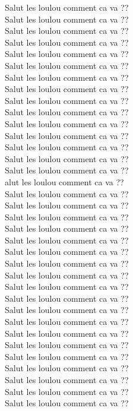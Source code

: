 Salut les loulou comment ca va ??\\
Salut les loulou comment ca va ??\\
Salut les loulou comment ca va ??\\
Salut les loulou comment ca va ??\\
Salut les loulou comment ca va ??\\
Salut les loulou comment ca va ??\\
Salut les loulou comment ca va ??\\
Salut les loulou comment ca va ??\\
Salut les loulou comment ca va ??\\
Salut les loulou comment ca va ??\\
Salut les loulou comment ca va ??\\
Salut les loulou comment ca va ??\\
Salut les loulou comment ca va ??\\
Salut les loulou comment ca va ??\\
Salut les loulou comment ca va ??\\alut les loulou comment ca va ??\\
Salut les loulou comment ca va ??\\
Salut les loulou comment ca va ??\\
Salut les loulou comment ca va ??\\
Salut les loulou comment ca va ??\\
Salut les loulou comment ca va ??\\
Salut les loulou comment ca va ??\\
Salut les loulou comment ca va ??\\
Salut les loulou comment ca va ??\\
Salut les loulou comment ca va ??\\
Salut les loulou comment ca va ??\\
Salut les loulou comment ca va ??\\
Salut les loulou comment ca va ??\\
Salut les loulou comment ca va ??\\
Salut les loulou comment ca va ??\\
Salut les loulou comment ca va ??\\
Salut les loulou comment ca va ??\\
Salut les loulou comment ca va ??\\
Salut les loulou comment ca va ??\\
Salut les loulou comment ca va ??\\
